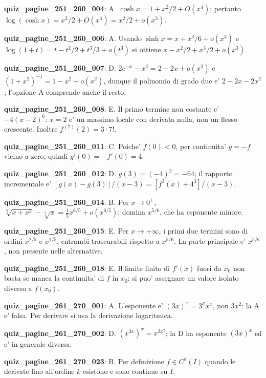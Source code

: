 \documentclass[11pt,a4paper]{article}
\newcounter{quiz}
\begin{document}
\noindent\textbf{quiz\_pagine\_251\_260\_004}: A. $\cosh x=1+x^2/2+O(x^4)$; pertanto $\log(\cosh x)=x^2/2+O(x^4)=x^2/2+o(x^3)$.\par\medskip
\noindent\textbf{quiz\_pagine\_251\_260\_006}: A. Usando $\sinh x=x+x^3/6+o(x^3)$ e $\log(1+t)=t-t^2/2+t^3/3+o(t^3)$ si ottiene $x-x^2/2+x^3/2+o(x^3)$.\par\medskip
\noindent\textbf{quiz\_pagine\_251\_260\_007}: D. $2e^{-x}-x^2=2-2x+o(x^2)$ e $(1+x^2)^{-1}=1-x^2+o(x^2)$, dunque il polinomio di grado due e' $2-2x-2x^2$; l'opzione A comprende anche il resto.\par\medskip
\noindent\textbf{quiz\_pagine\_251\_260\_008}: E. Il primo termine non costante e' $-4(x-2)^6$: $x=2$ e' un massimo locale con derivata nulla, non un flesso crescente. Inoltre $f^{(7)}(2)=3\cdot7!$.\par\medskip
\noindent\textbf{quiz\_pagine\_251\_260\_011}: C. Poiche' $f(0)<0$, per continuita' $g=-f$ vicino a zero, quindi $g'(0)=-f'(0)=4$.\par\medskip
\noindent\textbf{quiz\_pagine\_251\_260\_012}: D. $g(3)=(-4)^3=-64$; il rapporto incrementale e' $[g(x)-g(3)]/(x-3)=[f^3(x)+4^3]/(x-3)$.\par\medskip
\noindent\textbf{quiz\_pagine\_251\_260\_014}: B. Per $x\to0^+$, $\sqrt[5]{x+x^2}-\sqrt[5]x=\frac15x^{6/5}+o(x^{6/5})$; domina $x^{5/6}$, che ha esponente minore.\par\medskip
\noindent\textbf{quiz\_pagine\_251\_260\_015}: E. Per $x\to+\infty$, i primi due termini sono di ordini $x^{2/5}$ e $x^{1/5}$, entrambi trascurabili rispetto a $x^{5/6}$. La parte principale e' $x^{5/6}$, non presente nelle alternative.\par\medskip
\noindent\textbf{quiz\_pagine\_251\_260\_018}: E. Il limite finito di $f'(x)$ fuori da $x_0$ non basta se manca la continuita' di $f$ in $x_0$: si puo' assegnare un valore isolato diverso a $f(x_0)$.\par\medskip
\noindent\textbf{quiz\_pagine\_261\_270\_001}: A. L'esponente e' $(3x)^x=3^xx^x$, non $3x^2$: la A e' falsa. Per derivare si usa la derivazione logaritmica.\par\medskip
\noindent\textbf{quiz\_pagine\_261\_270\_002}: D. $(x^{3x})^x=x^{3x^2}$; la D ha esponente $(3x)^x$ ed e' in generale diversa.\par\medskip
\noindent\textbf{quiz\_pagine\_261\_270\_023}: B. Per definizione $f\in C^k(I)$ quando le derivate fino all'ordine $k$ esistono e sono continue su $I$.\par\medskip
\end{document}
